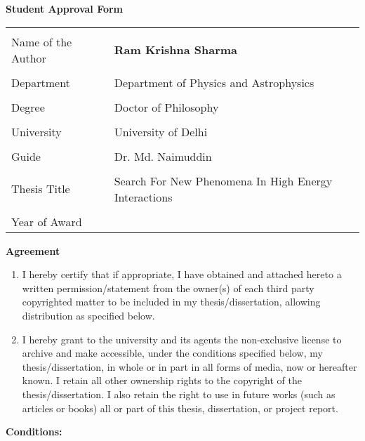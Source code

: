 \begin{center}
\textbf{\LARGE Student Approval Form}
\end{center}
\vspace{1cm}
%
%
%
\begin{tabular}{|l|p{12cm}|} \hline
 & \\ [-1em]
Name of the Author & {\bf Ram Krishna Sharma}\\ \hline
 & \\ [-1em]
Department & Department of Physics and Astrophysics\\ \hline
 & \\ [-1em]
Degree &  Doctor of Philosophy \\ \hline
 & \\ [-1em]
University & University of Delhi \\ \hline
 & \\ [-1em]
Guide & Dr. Md. Naimuddin \\ \hline
 & \\ [-1em]
Thesis Title & Search For New Phenomena In High Energy Interactions\\ \hline
 & \\ [-1em]
Year of Award & \\ \hline
\end{tabular}
%
%
%
\vspace{1cm}
%
%
%
\begin{center}
\textbf{Agreement} \\
\end{center}
\vspace{0.5cm}
\begin{enumerate}
\item I hereby certify that if appropriate, I have obtained and attached hereto a written permission/statement from the owner(s) of each third party copyrighted matter to be included in my thesis/dissertation, allowing distribution as specified below.
\item I hereby grant to the university and its agents the non-exclusive license to archive and make accessible, under the conditions specified below, my thesis/dissertation, in whole or in part in all forms of media, now or hereafter known. I retain all other ownership rights to the copyright of the thesis/dissertation. I also retain the right to use in future works (such as articles or books) all or part of this thesis, dissertation, or project report.
\end{enumerate}
\vspace{1cm}
%
%
%
\textbf{Conditions:} \\
